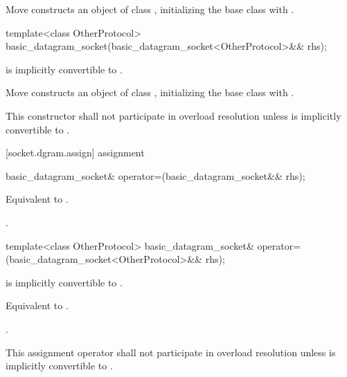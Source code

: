 \begin{itemdescr}
\pnum
\effects Move constructs an object of class , initializing the base class with .
\end{itemdescr}

\begin{itemdecl}
template<class OtherProtocol>
  basic_datagram_socket(basic_datagram_socket<OtherProtocol>&& rhs);
\end{itemdecl}

\begin{itemdescr}
\pnum
\requires {} is implicitly convertible to .

\pnum
\effects Move constructs an object of class , initializing the base class with .

\pnum
\remarks This constructor shall not participate in overload resolution unless  is implicitly convertible to .
\end{itemdescr}



[socket.dgram.assign]{ assignment}

\begin{itemdecl}
basic_datagram_socket& operator=(basic_datagram_socket&& rhs);
\end{itemdecl}

\begin{itemdescr}
\pnum
\effects Equivalent to .

\pnum
\returns {}.
\end{itemdescr}

\begin{itemdecl}
template<class OtherProtocol>
  basic_datagram_socket& operator=(basic_datagram_socket<OtherProtocol>&& rhs);
\end{itemdecl}

\begin{itemdescr}
\pnum
\requires {} is implicitly convertible to .

\pnum
\effects Equivalent to .

\pnum
\returns {}.

\pnum
\remarks This assignment operator shall not participate in overload resolution unless  is implicitly convertible to .
\end{itemdescr}



